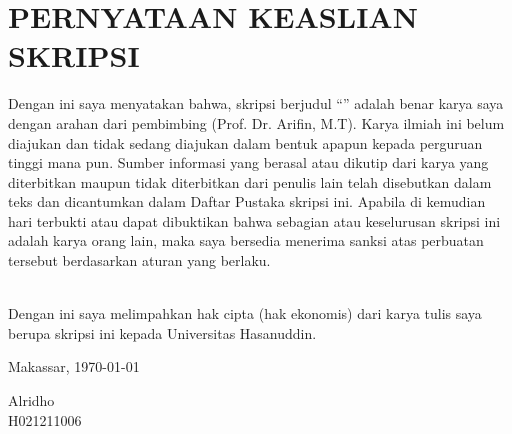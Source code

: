 \begingroup
\singlespacing
\chapter*{PERNYATAAN KEASLIAN SKRIPSI}
\noindent
Dengan ini saya menyatakan bahwa, skripsi berjudul “\textbf{\JudulSkripsi}”
adalah benar karya saya dengan arahan dari pembimbing (Prof. Dr.
Arifin, M.T). Karya ilmiah ini belum diajukan dan tidak sedang
diajukan dalam bentuk apapun kepada perguruan tinggi mana pun. Sumber
informasi yang berasal atau dikutip dari karya yang diterbitkan
maupun tidak diterbitkan dari penulis lain telah disebutkan dalam
teks dan dicantumkan dalam Daftar Pustaka skripsi ini. Apabila di
kemudian hari terbukti atau dapat dibuktikan bahwa sebagian atau
keselurusan skripsi ini adalah karya orang lain, maka saya bersedia
menerima sanksi atas perbuatan tersebut berdasarkan aturan yang berlaku. \par

\noindent
\\
Dengan ini saya melimpahkan hak cipta (hak ekonomis) dari karya tulis
saya berupa skripsi ini kepada Universitas Hasanuddin. \par

\vspace{2cm}

\hfill
\begin{minipage}{0.4\textwidth}
  \raggedleft
  Makassar, \today \par
  \vspace{2cm}
  Alridho \\
  H021211006
\end{minipage}
\endgroup
